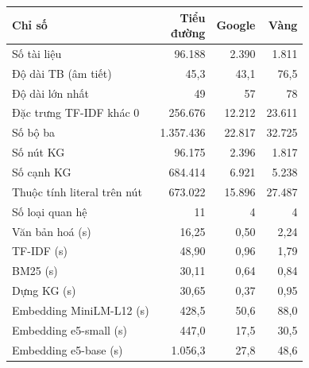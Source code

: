 \begin{tabular}{lrrr}
\toprule
Chỉ số & \makecell[r]{Tiểu\\đường} & Google & Vàng \\
\midrule
Số tài liệu & 96{.}188 & 2{.}390 & 1{.}811 \\
Độ dài TB (âm tiết) & 45{,}3 & 43{,}1 & 76{,}5 \\
Độ dài lớn nhất & 49 & 57 & 78 \\
Đặc trưng TF-IDF khác 0 & 256{.}676 & 12{.}212 & 23{.}611 \\
Số bộ ba & 1{.}357{.}436 & 22{.}817 & 32{.}725 \\
Số nút KG & 96{.}175 & 2{.}396 & 1{.}817 \\
Số cạnh KG & 684{.}414 & 6{.}921 & 5{.}238 \\
Thuộc tính literal trên nút & 673{.}022 & 15{.}896 & 27{.}487 \\
Số loại quan hệ & 11 & 4 & 4 \\
\midrule
Văn bản hoá (s) & 16{,}25 & 0{,}50 & 2{,}24 \\
TF-IDF (s) & 48{,}90 & 0{,}96 & 1{,}79 \\
BM25 (s) & 30{,}11 & 0{,}64 & 0{,}84 \\
Dựng KG (s) & 30{,}65 & 0{,}37 & 0{,}95 \\
Embedding MiniLM-L12 (s) & 428{,}5 & 50{,}6 & 88{,}0 \\
Embedding e5-small (s) & 447{,}0 & 17{,}5 & 30{,}5 \\
Embedding e5-base (s) & 1{.}056{,}3 & 27{,}8 & 48{,}6 \\
\bottomrule
\end{tabular}
